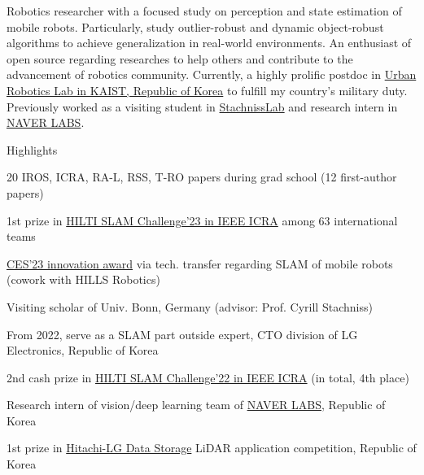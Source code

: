 

\begin{cvparagraph}

Robotics researcher with a focused study on perception and state estimation of mobile robots.
Particularly, study outlier-robust and dynamic object-robust algorithms to achieve generalization in real-world environments.
An enthusiast of open source regarding researches to help others and contribute to the advancement of robotics community.
Currently, a highly prolific postdoc in \href{https://urobot.kaist.ac.kr/}{Urban Robotics Lab in KAIST, Republic of Korea} to fulfill my country's military duty.
Previously worked as a visiting student in \href{https://www.ipb.uni-bonn.de/}{StachnissLab} and research intern in \href{https://www.naverlabs.com/}{NAVER LABS}.
\end{cvparagraph}

\newcommand{\lineintv}{\vspace{0.0cm}} %

\cventry
  {} %
  {Highlights\vspace{-0.3cm}} %
  {} %
  {} %
  {
    \begin{cvitems} %
      \item {20 IROS, ICRA, RA-L, RSS, T-RO papers during grad school (12 first-author papers)\lineintv}
      \item {1st prize in \href{https://hilti-challenge.com/}{HILTI SLAM Challenge'23 in IEEE ICRA} among 63 international teams\lineintv}
      \item {\href{https://www.ces.tech/innovation-awards/honorees/2023/honorees/h/hi-bot-hologram-image-guide-robot.aspx}{CES'23 innovation award} via tech. transfer regarding SLAM of mobile robots (cowork with HILLS Robotics)\lineintv}
      \item {Visiting scholar of Univ. Bonn, Germany (advisor: Prof. Cyrill Stachniss)\lineintv}
      \item {From 2022, serve as a SLAM part outside expert, CTO division of LG Electronics, Republic of Korea\lineintv}
      \item {2nd cash prize in \href{https://hilti-challenge.com/}{HILTI SLAM Challenge'22 in IEEE ICRA} (in total, 4th place)\lineintv}
      \item {Research intern of vision/deep learning team of \href{https://www.naverlabs.com/}{NAVER LABS}, Republic of Korea\lineintv}
      \item {1st prize in \href{https://hitachi-lg.com/}{Hitachi-LG Data Storage} LiDAR application competition, Republic of Korea\lineintv}
    \end{cvitems}
  }


